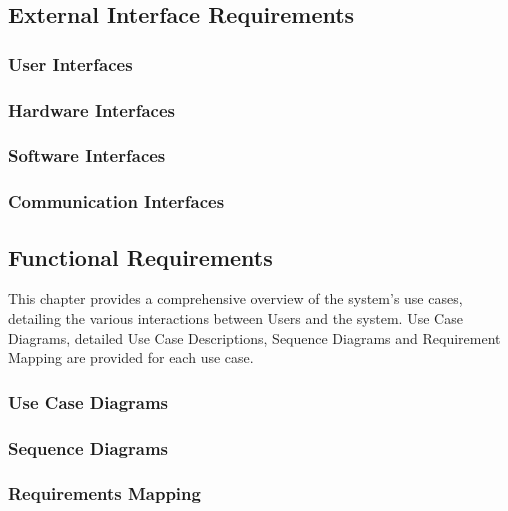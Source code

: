\subsection{External Interface Requirements}
\subsubsection{User Interfaces}
\subsubsection{Hardware Interfaces}
\subsubsection{Software Interfaces}
\subsubsection{Communication Interfaces}
\subsection{Functional Requirements}
This chapter provides a comprehensive overview of the system's use cases, detailing the various interactions between Users and the system.
Use Case Diagrams, detailed Use Case Descriptions, Sequence Diagrams and Requirement Mapping are provided for each use case.
\subsubsection{Use Case Diagrams}
\subsubsection{Sequence Diagrams}
\subsubsection{Requirements Mapping}

